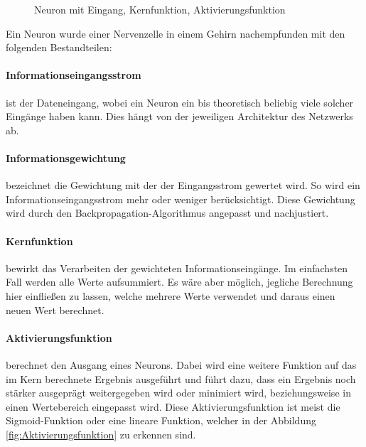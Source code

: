 \begin{figure}
\centering


	\caption{Neuron mit Eingang, Kernfunktion, Aktivierungsfunktion}
	\label{fig:Neuron}
\end{figure}

Ein Neuron wurde einer Nervenzelle in einem Gehirn nachempfunden mit den folgenden Bestandteilen:
\paragraph{Informationseingangsstrom} ist der Dateneingang, wobei ein Neuron ein bis theoretisch beliebig viele solcher Eingänge haben kann. 
Dies hängt von der jeweiligen Architektur des Netzwerks ab.

\paragraph{Informationsgewichtung} bezeichnet die Gewichtung mit der der Eingangsstrom gewertet wird. 
So wird ein Informationseingangsstrom mehr oder weniger berücksichtigt. 
Diese Gewichtung wird durch den Backpropagation-Algorithmus angepasst und nachjustiert.

\paragraph{Kernfunktion} bewirkt das Verarbeiten der gewichteten Informationseingänge. 
Im einfachsten Fall werden alle Werte aufsummiert. 
Es wäre aber möglich, jegliche Berechnung hier einfließen zu lassen, welche mehrere Werte verwendet und daraus einen neuen Wert berechnet.

\paragraph{Aktivierungsfunktion} berechnet den Ausgang eines Neurons. 
Dabei wird eine weitere Funktion auf das im Kern berechnete Ergebnis ausgeführt und führt dazu, dass ein Ergebnis noch stärker ausgeprägt weitergegeben wird oder minimiert wird, beziehungsweise in einen Wertebereich eingepasst wird. 
Diese Aktivierungsfunktion ist meist die Sigmoid-Funktion oder eine lineare Funktion, welcher in der Abbildung \ref{fig:Aktivierungsfunktion} zu erkennen sind.

